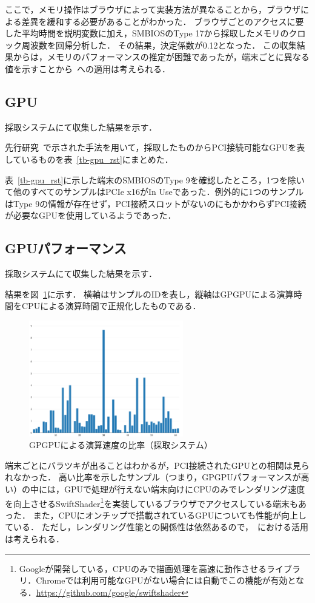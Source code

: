 ここで，メモリ操作はブラウザによって実装方法が異なることから，ブラウザによる差異を緩和する必要があることがわかった．
ブラウザごとのアクセスに要した平均時間を説明変数に加え，SMBIOSのType 17から採取したメモリのクロック周波数を回帰分析した．
その結果，決定係数が0.12となった．
この収集結果からは，メモリのパフォーマンスの推定が困難であったが，端末ごとに異なる値を示すことから\fp~への適用は考えられる．

\subsection{GPU}
採取システムにて収集した結果を示す．

先行研究~\cite{mowery2012pixel}で示された手法を用いて，採取したものからPCI接続可能なGPUを表しているものを表~\ref{tb-gpu_rst}にまとめた．



表~\ref{tb-gpu_rst}に示した端末のSMBIOSのType 9を確認したところ，1つを除いて他のすべてのサンプルはPCIe x16がIn Useであった．例外的に1つのサンプルはType 9の情報が存在せず，PCI接続スロットがないのにもかかわらずPCI接続が必要なGPUを使用しているようであった．

\subsection{GPUパフォーマンス}
採取システムにて収集した結果を示す．

結果を図~\ref{fig-gpgpu_rst}に示す．
横軸はサンプルのIDを表し，縦軸はGPGPUによる演算時間をCPUによる演算時間で正規化したものである．

\begin{figure}[H]
    \centering
    \includegraphics[width=0.6\textwidth,pagebox=cropbox]{fig/gpgpu_rst.pdf}
    \caption{GPGPUによる演算速度の比率（採取システム）}
    \label{fig-gpgpu_rst}
\end{figure}

端末ごとにバラツキが出ることはわかるが，PCI接続されたGPUとの相関は見られなかった．
高い比率を示したサンプル（つまり，GPGPUパフォーマンスが高い）の中には，GPUで処理が行えない端末向けにCPUのみでレンダリング速度を向上させるSwiftShader\footnote{Googleが開発している，CPUのみで描画処理を高速に動作させるライブラリ．Chromeでは利用可能なGPUがない場合には自動でこの機能が有効となる．\url{https://github.com/google/swiftshader}}を実装しているブラウザでアクセスしている端末もあった．
また，CPUにオンチップで搭載されているGPUについても性能が向上している．
ただし，レンダリング性能との関係性は依然あるので，\fp~における活用は考えられる．
